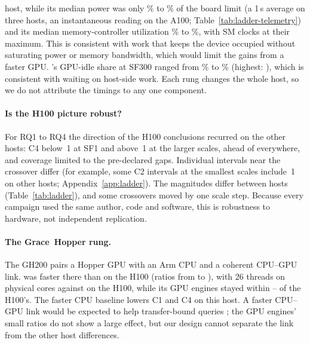 \documentclass[11pt]{article}
\begin{document}
host, while its median power was only \%
to \% of the board limit (a 1\,s average
on three hosts, an instantaneous reading on the A100; Table~\ref{tab:ladder-telemetry}) and its
median memory-controller utilization \%
to \%, with SM clocks at their
maximum. This is consistent with \polarsgpu{} work that keeps the device
occupied without saturating power or memory bandwidth, which would limit the
gains from a faster GPU. \sparkgpu{}'s GPU-idle share at SF300 ranged from
\% to
\% (highest:
), which is consistent with
\sparkgpu{} waiting on host-side work. Each rung changes the whole host, so we
do not attribute the timings to any one component.

\paragraph{Is the H100 picture robust?} For RQ1 to RQ4 the direction of the
H100 conclusions recurred on the other hosts: C4 below~1 at SF1 and above~1 at
the larger scales, \polarsgpu{} ahead of \sparkgpu{} everywhere, and coverage
limited to the pre-declared gaps. Individual intervals near the crossover
differ (for example, some C2 intervals at the smallest scales include~1 on
other hosts; Appendix~\ref{app:ladder}). The
magnitudes differ between hosts (Table~\ref{tab:ladder}), and some crossovers
moved by one scale step. Because every campaign used the same author, code and
software, this is robustness to hardware, not independent replication.
\ifghtwohundredran

\paragraph{The Grace~Hopper rung.} The GH200 pairs a Hopper GPU with an Arm CPU
and a coherent CPU--GPU link. \polarscpu{} was faster there than on the H100
(ratios from  to
), with 26 threads on
 physical cores against
 on the H100, while its GPU engines stayed within
-- of the
H100's. The faster CPU baseline lowers C1 and C4 on this host. A faster
CPU--GPU link would be expected to help transfer-bound queries
\citep{lutz2020pump}; the GPU engines' small ratios do not show a large effect,
but our design cannot separate the link from the other host differences.
\fi
\ifaonehundredran
\end{document}
